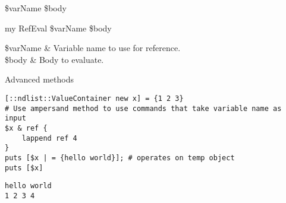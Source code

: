 \begin{syntax}
 \$varName \$body
\end{syntax}
\begin{syntax}
my RefEval \$varName \$body
\end{syntax}
\begin{args}
\$varName & Variable name to use for reference. \\
\$body & Body to evaluate.
\end{args}
\begin{example}{Advanced methods}
\begin{lstlisting}
[::ndlist::ValueContainer new x] = {1 2 3}
# Use ampersand method to use commands that take variable name as input
$x & ref {
    lappend ref 4
}
puts [$x | = {hello world}]; # operates on temp object
puts [$x]
\end{lstlisting}
\tcblower
\begin{lstlisting}
hello world
1 2 3 4
\end{lstlisting}
\end{example}


